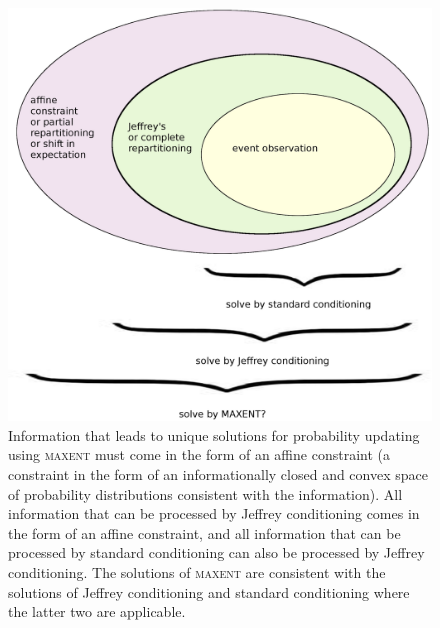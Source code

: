 \begin{figure}[htp!]
  \begin{flushright}
    \begin{minipage}[h]{.8\linewidth}
      \includegraphics[width=\textwidth]{affine1.eps}
      \caption{Information that leads to unique solutions for
        probability updating using \textsc{maxent} must come in the
        form of an affine constraint (a constraint in the form of an
        informationally closed and convex space of probability
        distributions consistent with the information). All
        information that can be processed by Jeffrey conditioning
        comes in the form of an affine constraint, and all information
        that can be processed by standard conditioning can also be
        processed by Jeffrey conditioning. The solutions of
        \textsc{maxent} are consistent with the solutions of Jeffrey
        conditioning and standard conditioning where the latter two
        are applicable.}
      \label{fig:aff}
    \end{minipage}
  \end{flushright}
\end{figure}

